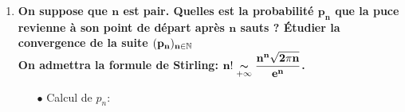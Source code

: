\documentclass[a4paper, 11pt,reqno]{article}
\begin{document}
\begin{correction}
\begin{enumerate}
\begin{itemize}
				      \begin{itemize}
					      \item[$\star$] Comme $k\in\intent{ -n,n}$, on a: $0\leq n+k\leq 2n$ et ainsi: $0\leq \ddp\frac{n+k}{2}\leq n\Leftrightarrow \ddp\frac{n+k}{2}\in \lbrack 0,n\rbrack$.
					      \item[$\star$] Mais il faut faire attention car $ \ddp\frac{n+k}{2}$ n'est pas forc\'ement un entier et ainsi on n'a pas forc\'ement que: $\ddp\frac{n+k}{2}\in \intent{ 0,n}$.
				      \end{itemize}
				      On doit donc distinguer deux cas selon que $n+k$ est pair ou imapir:
				      \begin{itemize}
					      \item[$\star$] CAS 1: si $k$ est tel que $n+k$ est impair:\\
						      \noindent Alors $\ddp\frac{n+k}{2}$ n'est pas un entier et ainsi $\ddp\frac{n+k}{2}\notin Y_n(\Omega)$ et donc $P(X_n=k)=P\left( Y_n=\ddp\frac{n+k}{2} \right)=0$.
					      \item[$\star$] CAS 2: si $k$ est tel que $n+k$ est pair:\\
						      \noindent Alors $\ddp\frac{n+k}{2}$ est un entier et ainsi $\ddp\frac{n+k}{2}\in Y_n(\Omega)$ et donc $P(X_n=k)=P\left( Y_n=\ddp\frac{n+k}{2} \right)=\ddp\binom{n}{\frac{n+k}{2}} \left(\ddp\demi  \right)^n$.
				      \end{itemize}
				      On obtient ainsi la loi de $X_n$:
				      $$\fbox{$
							      \forall k\in \intent{ -n,n},\ P(X_n=k)=\left\lbrace\begin{array}{ll}
								      \ddp\binom{n}{\frac{n+k}{2}} \left(\ddp\demi  \right)^n & \hbox{si}\ n+k\ \hbox{pair}\vsec \\
								      0                                                       & \hbox{si}\ n+k\ \hbox{impair}.
							      \end{array}\right.
							      .$}$$
		      \end{itemize}
		\item \textbf{On suppose que $\mathbf{n}$ est pair. Quelles est la probabilit\'e $\mathbf{p_n}$ que la puce revienne \`a son point de d\'epart apr\`es $\mathbf{n}$ sauts ? \'Etudier la convergence de la suite $\mathbf{(p_n)_{n\in\mathbb{N}}}$ }\\
		      \noindent \textbf{On admettra la formule de Stirling: $\mathbf{n!\underset{+\infty}{\thicksim} \displaystyle\frac{n^n \sqrt{2\pi n}}{e^n}}$.}
		      \begin{itemize}
			      \item[$\bullet$] Calcul de $p_n$:\\

\end{itemize}
\end{enumerate}
\end{correction}
\end{document}
